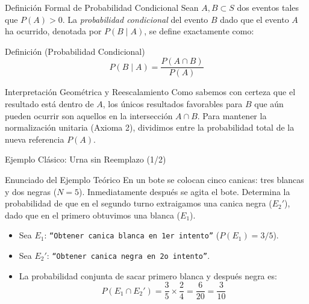 \documentclass[10pt,aspectratio=169]{beamer}
\begin{document}
\begin{frame}{Definición Formal de Probabilidad Condicional}
  \small Sean $A, B \subset S$ dos eventos tales que $P(A) > 0$. La \emph{probabilidad condicional} del evento $B$ dado que el evento $A$ ha ocurrido, denotada por $P(B \mid A)$, se define exactamente como: \pause

  \vspace{0.2em}
  \begin{block}{Definición (Probabilidad Condicional)}
    $$P(B \mid A) = \dfrac{P(A \cap B)}{P(A)}$$
  \end{block}

  \vspace{0.1em}
  \pause
  \begin{alertblock}{Interpretación Geométrica y Reescalamiento}
    Como sabemos con certeza que el resultado está dentro de $A$, los únicos resultados favorables para $B$ que aún pueden ocurrir son aquellos en la intersección $A \cap B$. Para mantener la normalización unitaria (Axioma 2), dividimos entre la probabilidad total de la nueva referencia $P(A)$.
  \end{alertblock}
\end{frame}

\begin{frame}{Ejemplo Clásico: Urna sin Reemplazo (1/2)}
  \small
  \begin{block}{Enunciado del Ejemplo Teórico}
    En un bote se colocan cinco canicas: tres blancas y dos negras ($N = 5$). Inmediatamente después se agita el bote. Determina la probabilidad de que en el segundo turno extraigamos una canica negra ($E_2'$), dado que en el primero obtuvimos una blanca ($E_1$).
  \end{block}

  \vspace{0.2em}
  \pause
  \begin{itemize}\itemsep=0.1em
    \item Sea $E_1$: \texttt{``Obtener canica blanca en 1er intento''} ($P(E_1) = 3/5$). \pause
    \item Sea $E_2'$: \texttt{``Obtener canica negra en 2o intento''}. \pause
    \item La probabilidad conjunta de sacar primero blanca y después negra es:
    $$P(E_1 \cap E_2') = \dfrac{3}{5} \times \dfrac{2}{4} = \dfrac{6}{20} = \dfrac{3}{10}$$
  \end{itemize}
\end{frame}
\end{document}
